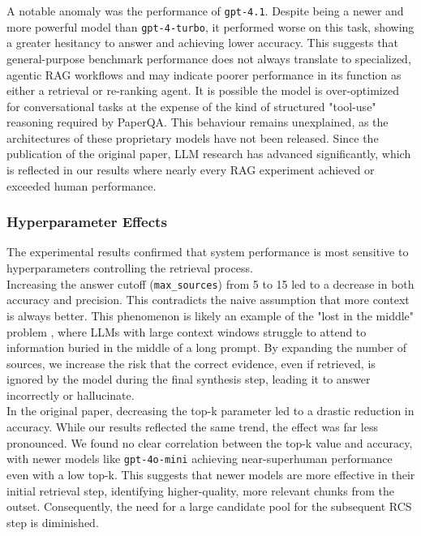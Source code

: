 A notable anomaly was the performance of \texttt{gpt-4.1}. Despite being a newer and more powerful model than \texttt{gpt-4-turbo}, it performed worse on this task, showing a greater hesitancy to answer and achieving lower accuracy. This suggests that general-purpose benchmark performance does not always translate to specialized, agentic RAG workflows and may indicate poorer performance in its function as either a retrieval or re-ranking agent. It is possible the model is over-optimized for conversational tasks at the expense of the kind of structured "tool-use" reasoning required by PaperQA. This behaviour remains unexplained, as the architectures of these proprietary models have not been released. Since the publication of the original paper, LLM research has advanced significantly, which is reflected in our results where nearly every RAG experiment achieved or exceeded human performance. \\

\subsubsection{Hyperparameter Effects}
The experimental results confirmed that system performance is most sensitive to hyperparameters controlling the retrieval process. \\

Increasing the answer cutoff (\texttt{max\_sources}) from 5 to 15 led to a decrease in both accuracy and precision. This contradicts the naive assumption that more context is always better. This phenomenon is likely an example of the "lost in the middle" problem \cite{liu_lost_2023}, where LLMs with large context windows struggle to attend to information buried in the middle of a long prompt. By expanding the number of sources, we increase the risk that the correct evidence, even if retrieved, is ignored by the model during the final synthesis step, leading it to answer incorrectly or hallucinate. \\

In the original paper, decreasing the top-k parameter led to a drastic reduction in accuracy. While our results reflected the same trend, the effect was far less pronounced. We found no clear correlation between the top-k value and accuracy, with newer models like \texttt{gpt-4o-mini} achieving near-superhuman performance even with a low top-k. This suggests that newer models are more effective in their initial retrieval step, identifying higher-quality, more relevant chunks from the outset. Consequently, the need for a large candidate pool for the subsequent RCS step is diminished. \\

